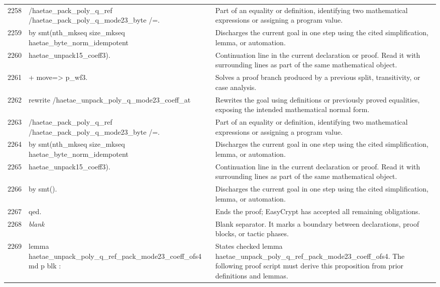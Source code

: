 \documentclass[10pt]{article}
\begin{document}
\begin{longtable}{r L{0.53\textwidth} L{0.37\textwidth}}
2258 & {\ttfamily\scriptsize           /haetae\_pack\_poly\_q\_ref /haetae\_pack\_poly\_q\_mode23\_byte /=.} & Part of an equality or definition, identifying two mathematical expressions or assigning a program value. \\
2259 & {\ttfamily\scriptsize   by smt(nth\_mkseq size\_mkseq haetae\_byte\_norm\_idempotent} & Discharges the current goal in one step using the cited simplification, lemma, or automation. \\
2260 & {\ttfamily\scriptsize          haetae\_unpack15\_coeff3).} & Continuation line in the current declaration or proof.  Read it with surrounding lines as part of the same mathematical object. \\
2261 & {\ttfamily\scriptsize + move=> p\_wf3.} & Solves a proof branch produced by a previous split, transitivity, or case analysis. \\
2262 & {\ttfamily\scriptsize   rewrite /haetae\_unpack\_poly\_q\_mode23\_coeff\_at} & Rewrites the goal using definitions or previously proved equalities, exposing the intended mathematical normal form. \\
2263 & {\ttfamily\scriptsize           /haetae\_pack\_poly\_q\_ref /haetae\_pack\_poly\_q\_mode23\_byte /=.} & Part of an equality or definition, identifying two mathematical expressions or assigning a program value. \\
2264 & {\ttfamily\scriptsize   by smt(nth\_mkseq size\_mkseq haetae\_byte\_norm\_idempotent} & Discharges the current goal in one step using the cited simplification, lemma, or automation. \\
2265 & {\ttfamily\scriptsize          haetae\_unpack15\_coeff3).} & Continuation line in the current declaration or proof.  Read it with surrounding lines as part of the same mathematical object. \\
2266 & {\ttfamily\scriptsize by smt().} & Discharges the current goal in one step using the cited simplification, lemma, or automation. \\
2267 & {\ttfamily\scriptsize qed.} & Ends the proof; EasyCrypt has accepted all remaining obligations. \\
2268 & {\ttfamily\scriptsize \emph{blank}} & Blank separator.  It marks a boundary between declarations, proof blocks, or tactic phases. \\
2269 & {\ttfamily\scriptsize lemma haetae\_unpack\_poly\_q\_ref\_pack\_mode23\_coeff\_ofs4 md p blk :} & States checked lemma haetae\_unpack\_poly\_q\_ref\_pack\_mode23\_coeff\_ofs4.  The following proof script must derive this proposition from prior definitions and lemmas. \\

\end{longtable}
\end{document}
